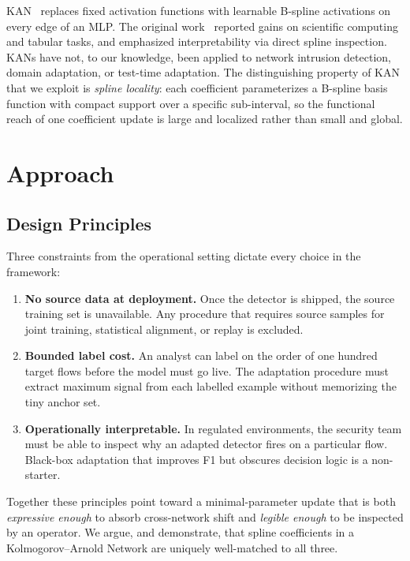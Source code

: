 \documentclass[10pt, conference, letterpaper]{IEEEtran}
\begin{document}
KAN~\cite{liu2024kan} replaces fixed activation functions with learnable B-spline activations on every edge of an MLP. The original work~\cite{liu2024kan, liu2024kan2} reported gains on scientific computing and tabular tasks, and emphasized interpretability via direct spline inspection. KANs have not, to our knowledge, been applied to network intrusion detection, domain adaptation, or test-time adaptation. The distinguishing property of KAN that we exploit is \emph{spline locality}: each coefficient parameterizes a B-spline basis function with compact support over a specific sub-interval, so the functional reach of one coefficient update is large and localized rather than small and global.


\section{Approach}
\label{sec:method}

\subsection{Design Principles}
\label{sec:principles}

Three constraints from the operational setting dictate every choice in the framework:

\begin{enumerate}
    \item \textbf{No source data at deployment.} Once the detector is shipped, the source training set is unavailable. Any procedure that requires source samples for joint training, statistical alignment, or replay is excluded.
    \item \textbf{Bounded label cost.} An analyst can label on the order of one hundred target flows before the model must go live. The adaptation procedure must extract maximum signal from each labelled example without memorizing the tiny anchor set.
    \item \textbf{Operationally interpretable.} In regulated environments, the security team must be able to inspect why an adapted detector fires on a particular flow. Black-box adaptation that improves F1 but obscures decision logic is a non-starter.
\end{enumerate}

Together these principles point toward a minimal-parameter update that is both \emph{expressive enough} to absorb cross-network shift and \emph{legible enough} to be inspected by an operator. We argue, and demonstrate, that spline coefficients in a Kolmogorov--Arnold Network are uniquely well-matched to all three.
\end{document}
